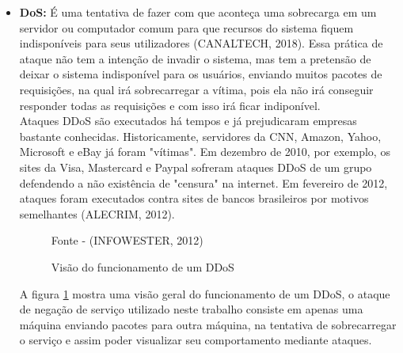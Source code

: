 \begin{itemize}
\item \textbf{DoS:} É uma tentativa de fazer com que aconteça uma sobrecarga em um servidor ou computador comum para que recursos do sistema fiquem indisponíveis para seus utilizadores (CANALTECH, 2018). Essa prática de ataque não tem a intenção de invadir o sistema, mas tem a pretensão de deixar o sistema indisponível para os usuários, enviando muitos pacotes de requisições, na qual irá sobrecarregar a vítima, pois ela não irá conseguir responder todas as requisições e com isso irá ficar indiponível.\\

Ataques DDoS são executados há tempos e já prejudicaram empresas bastante conhecidas. Historicamente, servidores da CNN, Amazon, Yahoo, Microsoft e eBay já foram "vítimas". Em dezembro de 2010, por exemplo, os sites da Visa, Mastercard e Paypal sofreram ataques DDoS de um grupo defendendo a não existência de "censura" na internet. Em fevereiro de 2012, ataques foram executados contra sites de bancos brasileiros por motivos semelhantes (ALECRIM, 2012).\\

\begin{figure}[htbp!] 
\begin{center}
\caption{Visão do funcionamento de um DDoS}
\small{Fonte - (INFOWESTER, 2012)}
\label{Fig:Visão do funcionamento de um DDOS}
\end{center} 
\end{figure}

A figura \ref{Fig:Visão do funcionamento de um DDOS} mostra uma visão geral do funcionamento de um DDoS, o ataque de negação de serviço utilizado neste trabalho consiste em apenas uma máquina enviando pacotes para outra máquina, na tentativa de sobrecarregar o serviço e assim poder visualizar seu comportamento mediante ataques.\\


\end{itemize}
